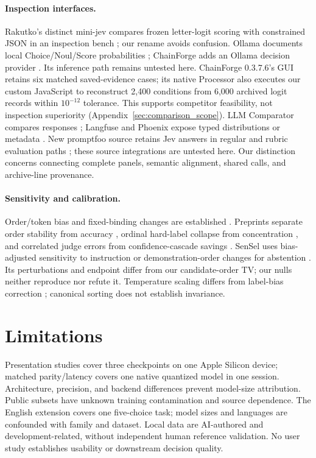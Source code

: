 \documentclass[11pt]{article}
\begin{document}
\paragraph{Inspection interfaces.}
Rakutko's distinct mini-jev compares frozen letter-logit scoring with constrained JSON in an inspection bench \citep{rakutko2026minijev}; our rename avoids confusion. Ollama documents local Choice/Noul/Score probabilities \citep{ollama2026decision}; ChainForge adds an Ollama decision provider \citep{arawjo2024chainforge,chainforge2026decision}. Its inference path remains untested here. ChainForge 0.3.7.6's GUI retains six matched saved-evidence cases; its native Processor also executes our custom JavaScript to reconstruct 2,400 conditions from 6,000 archived logit records within $10^{-12}$ tolerance. This supports competitor feasibility, not inspection superiority (Appendix~\ref{sec:comparison_scope}). LLM Comparator compares responses \citep{kahng2025comparator}; Langfuse and Phoenix expose typed distributions or metadata \citep{langfuse2026jev,phoenix2026jev}. New promptfoo source retains Jev answers in regular and rubric evaluation paths \citep{promptfoo2026typesafe}; these source integrations are untested here. Our distinction concerns connecting complete panels, semantic alignment, shared calls, and archive-line provenance.

\paragraph{Sensitivity and calibration.}
Order/token bias and fixed-binding changes are established \citep{wei2024unveiling,zheng2024selectors}. Preprints separate order stability from accuracy \citep{hanna2026diverge}, ordinal hard-label collapse from concentration \citep{gao2026ordinal}, and correlated judge errors from confidence-cascade savings \citep{rao2026rubric}. SenSel uses bias-adjusted sensitivity to instruction or demonstration-order changes for abstention \citep{chen2023sensel}. Its perturbations and endpoint differ from our candidate-order TV; our nulls neither reproduce nor refute it. Temperature scaling \citep{guo2017calibration} differs from label-bias correction \citep{zhao2021calibrate}; canonical sorting does not establish invariance.

\section*{Limitations}
Presentation studies cover three checkpoints on one Apple Silicon device; matched parity/latency covers one native quantized model in one session. Architecture, precision, and backend differences prevent model-size attribution. Public subsets have unknown training contamination and source dependence. The English extension covers one five-choice task; model sizes and languages are confounded with family and dataset. Local data are AI-authored and development-related, without independent human reference validation. No user study establishes usability or downstream decision quality.
\end{document}
